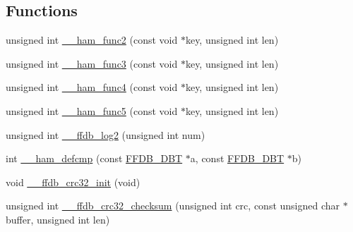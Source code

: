 \subsection*{Functions}
\begin{DoxyCompactItemize}
\item 
unsigned int \mbox{\hyperlink{adat-devel_2other__libs_2filedb_2filehash_2ffdb__hash__func_8h_a71d4674a43273f69f1116128d536a9bc}{\+\_\+\+\_\+ham\+\_\+func2}} (const void $\ast$key, unsigned int len)
\item 
unsigned int \mbox{\hyperlink{adat-devel_2other__libs_2filedb_2filehash_2ffdb__hash__func_8h_aedf4585bfc48595964ad01644ad19e76}{\+\_\+\+\_\+ham\+\_\+func3}} (const void $\ast$key, unsigned int len)
\item 
unsigned int \mbox{\hyperlink{adat-devel_2other__libs_2filedb_2filehash_2ffdb__hash__func_8h_a6d9b74fa768ec9e76fc2a0f7dd6d5461}{\+\_\+\+\_\+ham\+\_\+func4}} (const void $\ast$key, unsigned int len)
\item 
unsigned int \mbox{\hyperlink{adat-devel_2other__libs_2filedb_2filehash_2ffdb__hash__func_8h_a81a42d643c836f388d6dc040e4b9b4c6}{\+\_\+\+\_\+ham\+\_\+func5}} (const void $\ast$key, unsigned int len)
\item 
unsigned int \mbox{\hyperlink{adat-devel_2other__libs_2filedb_2filehash_2ffdb__hash__func_8h_a79d8cb8240ebb32c74ba51a0eac8aa64}{\+\_\+\+\_\+ffdb\+\_\+log2}} (unsigned int num)
\item 
int \mbox{\hyperlink{adat-devel_2other__libs_2filedb_2filehash_2ffdb__hash__func_8h_a84933d22e6744fb559a08e95010872e6}{\+\_\+\+\_\+ham\+\_\+defcmp}} (const \mbox{\hyperlink{adat-devel_2other__libs_2filedb_2filehash_2ffdb__db_8h_aa2e0984399491df0fdd20898ca8758f9}{F\+F\+D\+B\+\_\+\+D\+BT}} $\ast$a, const \mbox{\hyperlink{adat-devel_2other__libs_2filedb_2filehash_2ffdb__db_8h_aa2e0984399491df0fdd20898ca8758f9}{F\+F\+D\+B\+\_\+\+D\+BT}} $\ast$b)
\item 
void \mbox{\hyperlink{adat-devel_2other__libs_2filedb_2filehash_2ffdb__hash__func_8h_a7dd14a868e00186dc5b316ff25f1f85e}{\+\_\+\+\_\+ffdb\+\_\+crc32\+\_\+init}} (void)
\item 
unsigned int \mbox{\hyperlink{adat-devel_2other__libs_2filedb_2filehash_2ffdb__hash__func_8h_afa8fcad8eecebc3b96f83a921a6c5a25}{\+\_\+\+\_\+ffdb\+\_\+crc32\+\_\+checksum}} (unsigned int crc, const unsigned char $\ast$buffer, unsigned int len)
\end{DoxyCompactItemize}
